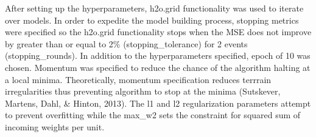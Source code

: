 \documentclass[12pt,twoside]{amherstthesis}
\begin{document}
  \begin{Shaded}
  \begin{Highlighting}[]
  \StringTok{ }\NormalTok{(}
    \NormalTok{(}\NormalTok{, }\NormalTok{),}
    \NormalTok{(}\NormalTok{(}\NormalTok{,}\NormalTok{),}\NormalTok{(}\NormalTok{,}\NormalTok{)),}
    \NormalTok{(}\NormalTok{,}\NormalTok{),}
    \NormalTok{(}\NormalTok{,}\NormalTok{,}\NormalTok{)}
  \NormalTok{)}
  \end{Highlighting}
  \end{Shaded}
  
  After setting up the hyperparameters, h2o.grid functionality was used to
  iterate over models. In order to expedite the model building process,
  stopping metrics were specified so the h2o.grid functionality stops when
  the MSE does not improve by greater than or equal to 2\%
  (stopping\_tolerance) for 2 events (stopping\_rounds). In addition to
  the hyperparameters specified, epoch of 10 was chosen. Momentum was
  specified to reduce the chance of the algorithm halting at a local
  minima. Theoretically, momentum specification reduces terrrain
  irregularities thus preventing algorithm to stop at the minima
  (Sutskever, Martens, Dahl, \& Hinton, 2013). The l1 and l2
  regularization parameters attempt to prevent overfitting while the
  max\_w2 sets the constraint for squared sum of incoming weights per
  unit.
  
\end{document}
